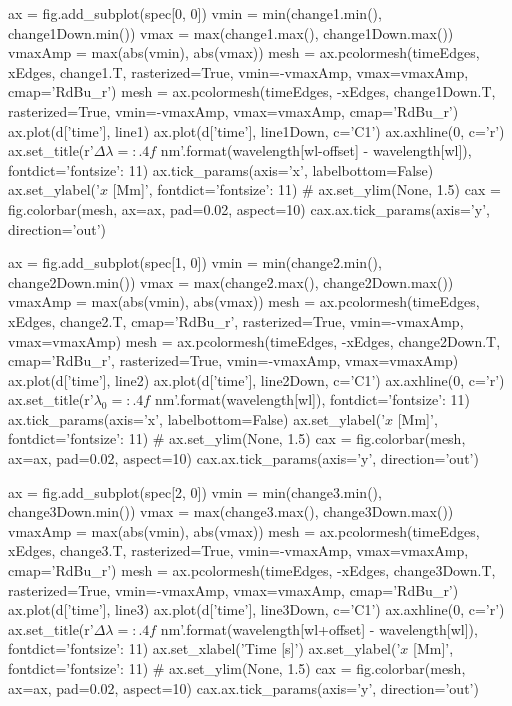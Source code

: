 \begin{pycode}[2DRT]
    ax = fig.add_subplot(spec[0, 0])
    vmin = min(change1.min(), change1Down.min())
    vmax = max(change1.max(), change1Down.max())
    vmaxAmp = max(abs(vmin), abs(vmax))
    mesh = ax.pcolormesh(timeEdges, xEdges, change1.T, rasterized=True, vmin=-vmaxAmp, vmax=vmaxAmp, cmap='RdBu_r')
    mesh = ax.pcolormesh(timeEdges, -xEdges, change1Down.T, rasterized=True, vmin=-vmaxAmp, vmax=vmaxAmp, cmap='RdBu_r')
    ax.plot(d['time'], line1)
    ax.plot(d['time'], line1Down, c='C1')
    ax.axhline(0, c='r')
    ax.set_title(r'$\Delta\lambda={:.4f}$ nm'.format(wavelength[wl-offset] - wavelength[wl]), fontdict={'fontsize': 11})
    ax.tick_params(axis='x', labelbottom=False)
    ax.set_ylabel('$x$ [Mm]', fontdict={'fontsize': 11})
#     ax.set_ylim(None, 1.5)
    cax = fig.colorbar(mesh, ax=ax, pad=0.02, aspect=10)
    cax.ax.tick_params(axis='y', direction='out')

    ax = fig.add_subplot(spec[1, 0])
    vmin = min(change2.min(), change2Down.min())
    vmax = max(change2.max(), change2Down.max())
    vmaxAmp = max(abs(vmin), abs(vmax))
    mesh = ax.pcolormesh(timeEdges, xEdges, change2.T, cmap='RdBu_r', rasterized=True, vmin=-vmaxAmp, vmax=vmaxAmp)
    mesh = ax.pcolormesh(timeEdges, -xEdges, change2Down.T, cmap='RdBu_r', rasterized=True, vmin=-vmaxAmp, vmax=vmaxAmp)
    ax.plot(d['time'], line2)
    ax.plot(d['time'], line2Down, c='C1')
    ax.axhline(0, c='r')
    ax.set_title(r'$\lambda_0={:.4f}$ nm'.format(wavelength[wl]), fontdict={'fontsize': 11})
    ax.tick_params(axis='x', labelbottom=False)
    ax.set_ylabel('$x$ [Mm]', fontdict={'fontsize': 11})
#     ax.set_ylim(None, 1.5)
    cax = fig.colorbar(mesh, ax=ax, pad=0.02, aspect=10)
    cax.ax.tick_params(axis='y', direction='out')

    ax = fig.add_subplot(spec[2, 0])
    vmin = min(change3.min(), change3Down.min())
    vmax = max(change3.max(), change3Down.max())
    vmaxAmp = max(abs(vmin), abs(vmax))
    mesh = ax.pcolormesh(timeEdges, xEdges, change3.T, rasterized=True, vmin=-vmaxAmp, vmax=vmaxAmp, cmap='RdBu_r')
    mesh = ax.pcolormesh(timeEdges, -xEdges, change3Down.T, rasterized=True, vmin=-vmaxAmp, vmax=vmaxAmp, cmap='RdBu_r')
    ax.plot(d['time'], line3)
    ax.plot(d['time'], line3Down, c='C1')
    ax.axhline(0, c='r')
    ax.set_title(r'$\Delta\lambda={:.4f}$ nm'.format(wavelength[wl+offset] - wavelength[wl]), fontdict={'fontsize': 11})
    ax.set_xlabel('Time [s]')
    ax.set_ylabel('$x$ [Mm]', fontdict={'fontsize': 11})
#     ax.set_ylim(None, 1.5)
    cax = fig.colorbar(mesh, ax=ax, pad=0.02, aspect=10)
    cax.ax.tick_params(axis='y', direction='out')


\end{pycode}
